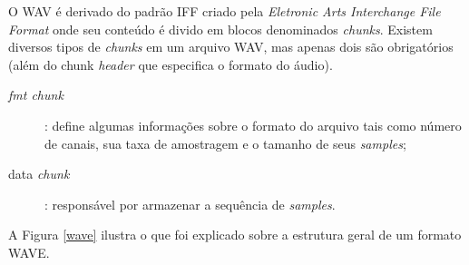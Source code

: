 O WAV é derivado do padrão IFF criado pela \textit{Eletronic Arts Interchange File Format} onde seu conteúdo é divido em blocos denominados \textit{chunks}. Existem diversos tipos de \textit{chunks} em um arquivo WAV, mas apenas dois são obrigatórios (além do chunk \textit{header} que especifica o formato do áudio).

\begin{description}
	\item [\textit{fmt chunk}]: define algumas informações sobre o formato do arquivo tais como número de canais, sua taxa de amostragem e o tamanho de seus \textit{samples};
	\item [data \textit{chunk}]: responsável por armazenar a sequência de \textit{samples}.
\end{description}

A Figura \ref{wave} ilustra o que foi explicado sobre a estrutura geral de um formato WAVE.

